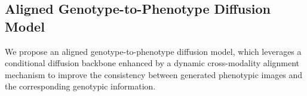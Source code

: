 \subsection{A\hspace{-0.26pt}l\hspace{-0.26pt}i\hspace{-0.26pt}g\hspace{-0.26pt}n\hspace{-0.26pt}e\hspace{-0.26pt}d \hspace{-0.4pt}G\hspace{-0.26pt}e\hspace{-0.26pt}n\hspace{-0.26pt}o\hspace{-0.26pt}t\hspace{-0.26pt}y\hspace{-0.26pt}p\hspace{-0.26pt}e-t\hspace{-0.26pt}o-P\hspace{-0.26pt}h\hspace{-0.26pt}e\hspace{-0.26pt}n\hspace{-0.26pt}o\hspace{-0.26pt}t\hspace{-0.26pt}y\hspace{-0.26pt}p\hspace{-0.26pt}e\hspace{-0.4pt} D\hspace{-0.26pt}i\hspace{-0.26pt}f\hspace{-0.26pt}f\hspace{-0.26pt}u\hspace{-0.26pt}s\hspace{-0.26pt}i\hspace{-0.26pt}o\hspace{-0.26pt}n\hspace{-0.4pt} M\hspace{-0.26pt}o\hspace{-0.26pt}d\hspace{-0.26pt}e\hspace{-0.26pt}l}


\label{sec:Alignment}

We propose an aligned genotype-to-phenotype diffusion model, which leverages a conditional diffusion backbone enhanced by a dynamic cross-modality alignment mechanism to improve the consistency between generated phenotypic images and the corresponding genotypic information.

